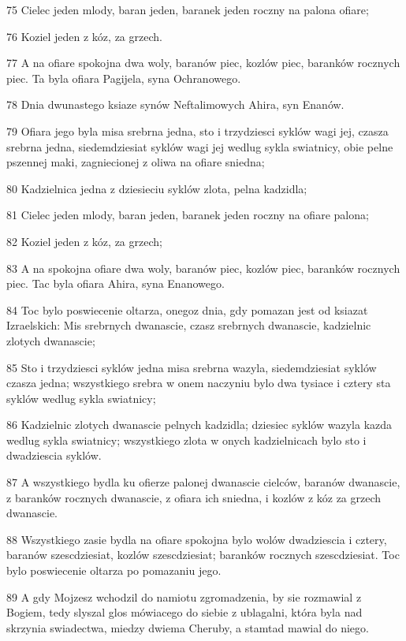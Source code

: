 \par 75 Cielec jeden mlody, baran jeden, baranek jeden roczny na palona ofiare;
\par 76 Koziel jeden z kóz, za grzech.
\par 77 A na ofiare spokojna dwa woly, baranów piec, kozlów piec, baranków rocznych piec. Ta byla ofiara Pagijela, syna Ochranowego.
\par 78 Dnia dwunastego ksiaze synów Neftalimowych Ahira, syn Enanów.
\par 79 Ofiara jego byla misa srebrna jedna, sto i trzydziesci syklów wagi jej, czasza srebrna jedna, siedemdziesiat syklów wagi jej wedlug sykla swiatnicy, obie pelne pszennej maki, zagniecionej z oliwa na ofiare sniedna;
\par 80 Kadzielnica jedna z dziesieciu syklów zlota, pelna kadzidla;
\par 81 Cielec jeden mlody, baran jeden, baranek jeden roczny na ofiare palona;
\par 82 Koziel jeden z kóz, za grzech;
\par 83 A na spokojna ofiare dwa woly, baranów piec, kozlów piec, baranków rocznych piec. Tac byla ofiara Ahira, syna Enanowego.
\par 84 Toc bylo poswiecenie oltarza, onegoz dnia, gdy pomazan jest od ksiazat Izraelskich: Mis srebrnych dwanascie, czasz srebrnych dwanascie, kadzielnic zlotych dwanascie;
\par 85 Sto i trzydziesci syklów jedna misa srebrna wazyla, siedemdziesiat syklów czasza jedna; wszystkiego srebra w onem naczyniu bylo dwa tysiace i cztery sta syklów wedlug sykla swiatnicy;
\par 86 Kadzielnic zlotych dwanascie pelnych kadzidla; dziesiec syklów wazyla kazda wedlug sykla swiatnicy; wszystkiego zlota w onych kadzielnicach bylo sto i dwadziescia syklów.
\par 87 A wszystkiego bydla ku ofierze palonej dwanascie cielców, baranów dwanascie, z baranków rocznych dwanascie, z ofiara ich sniedna, i kozlów z kóz za grzech dwanascie.
\par 88 Wszystkiego zasie bydla na ofiare spokojna bylo wolów dwadziescia i cztery, baranów szescdziesiat, kozlów szescdziesiat; baranków rocznych szescdziesiat. Toc bylo poswiecenie oltarza po pomazaniu jego.
\par 89 A gdy Mojzesz wchodzil do namiotu zgromadzenia, by sie rozmawial z Bogiem, tedy slyszal glos mówiacego do siebie z ublagalni, która byla nad skrzynia swiadectwa, miedzy dwiema Cheruby, a stamtad mawial do niego.

